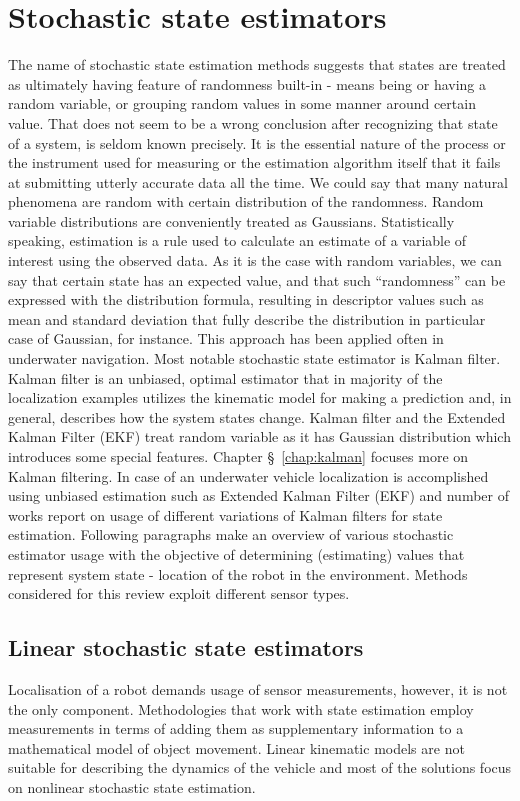 \section{Stochastic state estimators}
The name of stochastic state estimation methods suggests that states are treated as ultimately having feature of randomness built-in - means being or having a random variable, or grouping random values in some manner around certain value. That does not seem to be a wrong conclusion after recognizing that state of a system, is seldom known precisely. It is the essential nature of the process or the instrument used for measuring or the estimation algorithm itself that it fails at submitting utterly accurate data all the time. We could say that many natural phenomena are random with certain distribution of the randomness. Random variable distributions are conveniently treated as Gaussians. Statistically speaking, estimation is a rule used to calculate an estimate of a variable of interest using the observed data. As it is the case with random variables, we can say that certain state has an expected value, and that such ``randomness'' can be expressed with the distribution formula, resulting in descriptor values such as mean and standard deviation that fully describe the distribution in particular case of Gaussian, for instance. This approach has been applied often in underwater navigation. Most notable stochastic state estimator is Kalman filter. Kalman filter is an unbiased, optimal estimator \cite{kalman60, grewal01} that in majority of the localization examples utilizes the kinematic model for making a prediction and, in general, describes how the system states change. Kalman filter and the Extended Kalman Filter (EKF) treat random variable as it has Gaussian distribution which introduces some special features. Chapter \S~\ref{chap:kalman} focuses more on Kalman filtering. In case of an underwater vehicle localization is accomplished using unbiased estimation such as Extended Kalman Filter (EKF) and number of works report on usage of different variations of Kalman filters for state estimation. Following paragraphs make an overview of various stochastic estimator usage with the objective of determining (estimating) values that represent system state - location of the robot in the environment. Methods considered for this review exploit different sensor types.
\subsection{Linear stochastic state estimators}
Localisation of a robot demands usage of sensor measurements, however, it is not the only component. Methodologies that work with state estimation employ measurements in terms of adding them as supplementary information to a mathematical model of object movement. Linear kinematic models are not suitable for describing the dynamics of the vehicle and most of the solutions focus on nonlinear stochastic state estimation.   
